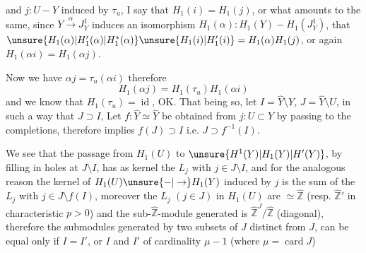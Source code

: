 and $j:U-Y$ induced by $\tau_u$, I say that $H_1(i)=H_1(j)$, or what amounts to the same, since $Y\xrightarrow{\alpha}J_Y^1$ induces an isomorphism $H_1(\alpha):H_1(Y)-H_1(J_Y^1)$, that $\unsure{H_1(\alpha)|H'_1(\alpha)|H_1^*(\alpha)}\unsure{H_1(i)|H'_1(i)}=H_1(\alpha)H_1(j)$, or again $H_1(\alpha i)=H_1(\alpha j)$.

Now we have $\alpha j=\tau_u(\alpha i)$ therefore 
\[
H_1(\alpha j)=H_1(\tau_u)H_1(\alpha i)
\]
and we know that $H_1(\tau_u)=\operatorname{id}$, OK. That being so, let $I=\widehat Y\setminus Y$, $J=\widehat Y\setminus U$, in such a way that $J\supset I$,  Let $f:\widehat Y\simeq\widehat Y$ be obtained from $j:U\subset Y$ by passing to the completions, therefore   implies $f(J)\supset I$ i.e. $J\supset f^{-1}(I)$.

We see that the passage from $H_1(U)$ to $\unsure{H^1(Y)|H_1(Y)|H'(Y)}$, by filling in holes at $J\setminus I$, has as kernel the  $L_j$ with $j\in J\setminus I$, and for the analogous reason the kernel of $H_1(U)\unsure{-|\to}H_1(Y)$ induced by $j$ is the sum of the $L_j$ with $j\in J\setminus f(I)$, moreover the $L_j$ $(j\in J)$ in $H_1(U)$ are $\simeq\widehat{\mathbb Z}$ (resp. $\widehat{\mathbb Z}'$ in characteristic $p>0$) and the sub-$\widehat{\mathbb Z}$-module generated is $\widehat{\mathbb Z}^{J}/\widehat{\mathbb Z}$ (diagonal), therefore  the submodules generated by two subsets  of $J$ distinct from $J$, can be equal only if $I=I'$, or $I$ and $I'$ of cardinality $\mu-1$ (where $\mu=\operatorname{card}J$)
